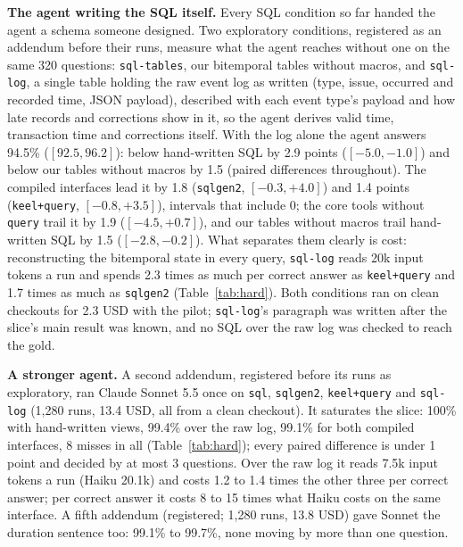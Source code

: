\documentclass[sigconf, nonacm]{acmart}
\newcommand{\code}[1]{\texttt{#1}}
\begin{document}
\textbf{The agent writing the SQL itself.} Every SQL condition so far handed the agent a schema someone designed. Two exploratory conditions, registered as an addendum before their runs, measure what the agent reaches without one on the same 320 questions: \code{sql-tables}, our bitemporal tables without macros, and \code{sql-log}, a single table holding the raw event log as written (type, issue, occurred and recorded time, JSON payload), described with each event type's payload and how late records and corrections show in it, so the agent derives valid time, transaction time and corrections itself. With the log alone the agent answers 94.5\% ($[92.5, 96.2]$): below hand-written SQL by 2.9 points ($[-5.0, -1.0]$) and below our tables without macros by 1.5 (paired differences throughout). The compiled interfaces lead it by 1.8 (\code{sqlgen2}, $[-0.3, +4.0]$) and 1.4 points (\code{keel+query}, $[-0.8, +3.5]$), intervals that include 0; the core tools without \code{query} trail it by 1.9 ($[-4.5, +0.7]$), and our tables without macros trail hand-written SQL by 1.5 ($[-2.8, -0.2]$). What separates them clearly is cost: reconstructing the bitemporal state in every query, \code{sql-log} reads 20k input tokens a run and spends 2.3 times as much per correct answer as \code{keel+query} and 1.7 times as much as \code{sqlgen2} (Table~\ref{tab:hard}). Both conditions ran on clean checkouts for 2.3 USD with the pilot; \code{sql-log}'s paragraph was written after the slice's main result was known, and no SQL over the raw log was checked to reach the gold.

\textbf{A stronger agent.} A second addendum, registered before its runs as exploratory, ran Claude Sonnet 5.5 once on \code{sql}, \code{sqlgen2}, \code{keel+query} and \code{sql-log} (1,280 runs, 13.4 USD, all from a clean checkout). It saturates the slice: 100\% with hand-written views, 99.4\% over the raw log, 99.1\% for both compiled interfaces, 8 misses in all (Table~\ref{tab:hard}); every paired difference is under 1 point and decided by at most 3 questions. Over the raw log it reads 7.5k input tokens a run (Haiku 20.1k) and costs 1.2 to 1.4 times the other three per correct answer; per correct answer it costs 8 to 15 times what Haiku costs on the same interface. A fifth addendum (registered; 1,280 runs, 13.8 USD) gave Sonnet the duration sentence too: 99.1\% to 99.7\%, none moving by more than one question.
\end{document}
